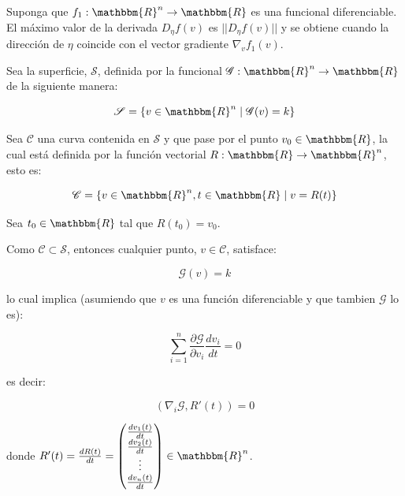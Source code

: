         \begin{teorema}
            Suponga que $f_1: \mathbbm{R}^n \to \mathbbm{R}$ es una funcional diferenciable. El máximo valor de la derivada $D_{\eta}f(v)$ es $||D_{\eta}f(v)||$ y se obtiene cuando la dirección de $\eta$ coincide con el vector gradiente $\nabla_v f_1(v)$.
        \end{teorema}

        Sea la superficie, $\mathscr{S}$, definida por la funcional $\mathscr{G}:\mathbbm{R}^n \to \mathbbm{R}$ de la siguiente manera:

        \begin{equation}
            \mathscr{S} = \left\{ v \in \mathbbm{R}^n \mid \mathscr{G}(v) = k \right\}
        \end{equation}

        Sea $\mathscr{C}$ una curva contenida en $\mathscr{S}$ y que pase por el punto $v_0 \in \mathbbm{R}$, la cual está definida por la función vectorial $R: \mathbbm{R} \to \mathbbm{R}^n$, esto es:

        \begin{equation}
            \mathscr{C} = \left\{ v \in \mathbbm{R}^n, t \in \mathbbm{R} \mid v = R(t)\right\}
        \end{equation}

        Sea $t_0 \in \mathbbm{R}$ tal que $R(t_0) = v_0$.

        Como $\mathscr{C} \subset \mathscr{S}$, entonces cualquier punto, $v \in \mathscr{C}$, satisface:

        \begin{equation*}
            \mathscr{G}(v) = k
        \end{equation*}

        lo cual implica (asumiendo que $v$ es una función diferenciable y que tambien $\mathscr{G}$ lo es):

        \begin{equation*}
            \sum_{i=1}^n \frac{\partial \mathscr{G}}{\partial v_i} \frac{d v_i}{dt} = 0
        \end{equation*}

        es decir:

        \begin{equation*}
            \left( \nabla_i \mathscr{G}, R'(t) \right) = 0
        \end{equation*}

        donde $R'(t) = \frac{dR(t)}{dt} = \begin{pmatrix} \frac{d v_1(t)}{dt} \\ \frac{d v_2(t)}{dt} \\ \vdots \\ \frac{d v_n(t)}{dt} \end{pmatrix} \in \mathbbm{R}^n$.


